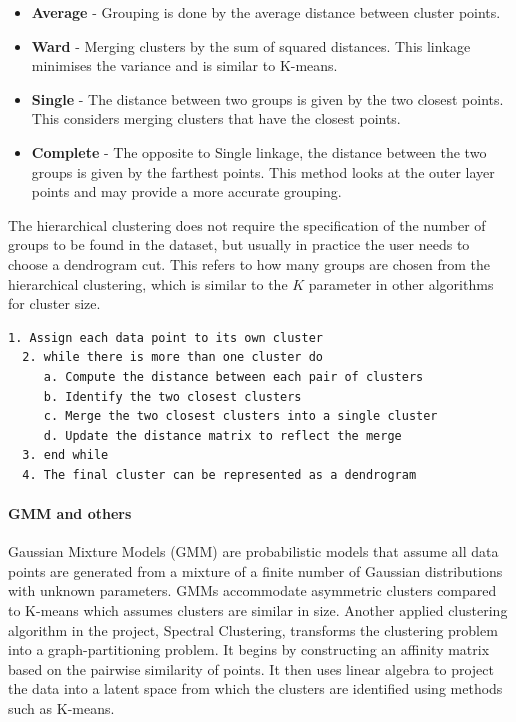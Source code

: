 \begin{itemize}
  \item \textbf{Average} - Grouping is done by the average distance between cluster points.
  \item \textbf{Ward} - Merging clusters by the sum of squared distances. This linkage minimises the variance and is similar to K-means.
  \item \textbf{Single} - The distance between two groups is given by the two closest points. This considers merging clusters that have the closest points.
  \item \textbf{Complete} - The opposite to Single linkage, the distance between the two groups is given by the farthest points. This method looks at the outer layer points and may provide a more accurate grouping.
\end{itemize}

The hierarchical clustering does not require the specification of the number of groups to be found in the dataset, but usually in practice the user needs to choose a dendrogram cut. This refers to how many groups are chosen from the hierarchical clustering, which is similar to the $K$ parameter in other algorithms for cluster size.


\begin{lstlisting}[float=!htb, caption={Agglomerative hierarchical clustering pseudocode}, label={code:agg_clustering}]
  1. Assign each data point to its own cluster
  2. while there is more than one cluster do
     a. Compute the distance between each pair of clusters
     b. Identify the two closest clusters
     c. Merge the two closest clusters into a single cluster
     d. Update the distance matrix to reflect the merge
  3. end while
  4. The final cluster can be represented as a dendrogram
\end{lstlisting}

\paragraph*{GMM and others}

Gaussian Mixture Models (GMM) are probabilistic models that assume all data points are generated from a mixture of a finite number of Gaussian distributions with unknown parameters. GMMs accommodate asymmetric clusters compared to K-means which assumes clusters are similar in size. Another applied clustering algorithm in the project, Spectral Clustering, transforms the clustering problem into a graph-partitioning problem. It begins by constructing an affinity matrix based on the pairwise similarity of points. It then uses linear algebra to project the data into a latent space from which the clusters are identified using methods such as K-means.


